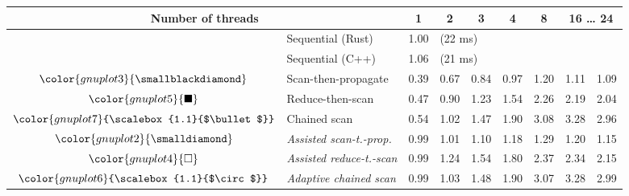 \begin{tabular}{clrrrrrrr}
\toprule
\multicolumn{2}{c}{\textbf{Number of threads}} & \multicolumn{1}{c}{\textbf{ 1 }} & \multicolumn{1}{c}{\textbf{ 2 }} & \multicolumn{1}{c}{\textbf{ 3 }} & \multicolumn{1}{c}{\textbf{ 4 }} & \multicolumn{1}{c}{\textbf{ 8 }} & \multicolumn{2}{c}{\textbf{ 16 } \dots \textbf{ 24 }} \\
\midrule
& Sequential (Rust) & \multicolumn{1}{r}{ 1.00 } & \multicolumn{ 6 }{l}{(22 ms)} \\
& Sequential (C++) & \multicolumn{1}{r}{ 1.06 } & \multicolumn{ 6 }{l}{(21 ms)} \\
\rowcolor{gnuplot3!10}$\color{gnuplot3}{\smallblackdiamond}$ & Scan-then-propagate & \cellcolor{gnuplot3!10} 0.39 & \cellcolor{gnuplot3!10} 0.67 & \cellcolor{gnuplot3!10} 0.84 & \cellcolor{gnuplot3!10} 0.97 & \cellcolor{gnuplot3!10} 1.20 & \cellcolor{gnuplot3!10} 1.11 & \cellcolor{gnuplot3!10} 1.09 \\
\rowcolor{gnuplot5!10}$\color{gnuplot5}{\blacksquare}$ & Reduce-then-scan & \cellcolor{gnuplot5!10} 0.47 & \cellcolor{gnuplot5!10} 0.90 & \cellcolor{gnuplot5!10} 1.23 & \cellcolor{gnuplot5!10} 1.54 & \cellcolor{gnuplot5!10} 2.26 & \cellcolor{gnuplot5!10} 2.19 & \cellcolor{gnuplot5!10} 2.04 \\
\rowcolor{gnuplot7!10}$\color{gnuplot7}{\scalebox{1.1}{$\bullet$}}$ & Chained scan & \cellcolor{gnuplot7!10} 0.54 & \cellcolor{gnuplot7!10} 1.02 & \cellcolor{gnuplot7!10} 1.47 & \cellcolor{gnuplot7!10} 1.90 & \cellcolor{gnuplot7!10} 3.08 & \cellcolor{gnuplot7!10} 3.28 & \cellcolor{gnuplot7!10} 2.96 \\
\rowcolor{gnuplot2!30}$\color{gnuplot2}{\smalldiamond}$ & \textit{Assisted scan-t.-prop.} & \cellcolor{gnuplot2!30} 0.99 & \cellcolor{gnuplot2!30} 1.01 & \cellcolor{gnuplot2!30} 1.10 & \cellcolor{gnuplot2!30} 1.18 & \cellcolor{gnuplot2!30} 1.29 & \cellcolor{gnuplot2!30} 1.20 & \cellcolor{gnuplot2!30} 1.15 \\
\rowcolor{gnuplot4!30}$\color{gnuplot4}{\square}$ & \textit{Assisted reduce-t.-scan} & \cellcolor{gnuplot4!30} 0.99 & \cellcolor{gnuplot4!30} 1.24 & \cellcolor{gnuplot4!30} 1.54 & \cellcolor{gnuplot4!30} 1.80 & \cellcolor{gnuplot4!30} 2.37 & \cellcolor{gnuplot4!30} 2.34 & \cellcolor{gnuplot4!30} 2.15 \\
\rowcolor{gnuplot6!30}$\color{gnuplot6}{\scalebox{1.1}{$\circ$}}$ & \textit{Adaptive chained scan} & \cellcolor{gnuplot6!30} 0.99 & \cellcolor{gnuplot6!30} 1.03 & \cellcolor{gnuplot6!30} 1.48 & \cellcolor{gnuplot6!30} 1.90 & \cellcolor{gnuplot6!30} 3.07 & \cellcolor{gnuplot6!30} 3.28 & \cellcolor{gnuplot6!30} 2.99 \\

\end{tabular}

